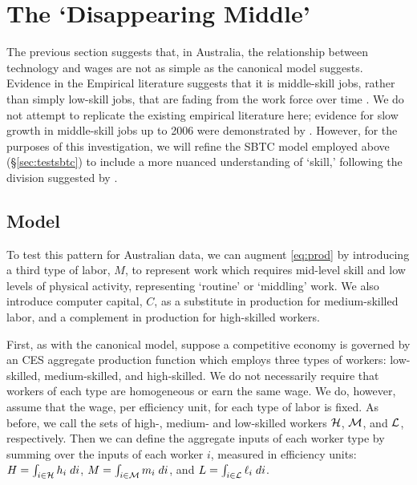 \section{The `Disappearing Middle'}\label{sec:disappearing}

The previous section suggests that, in Australia, the relationship between technology and wages are not as simple as the canonical model suggests. Evidence in the Empirical literature suggests that it is middle-skill jobs, rather than simply low-skill jobs, that are fading from the work force over time \citep[][e.g.]{Harding1997,Cully1999,Esposto2012}. We do not attempt to replicate the existing empirical literature here; evidence for slow growth in middle-skill jobs up to 2006 were demonstrated by \citep{Esposto2012}. However, for the purposes of this investigation, we will refine the SBTC model employed above (\S\ref{sec:testsbtc}) to include a more nuanced understanding of `skill,' following the division suggested by \citet{Levy2003}.

\subsection{Model}

To test this pattern for Australian data, we can augment \eqref{eq:prod} by introducing a third type of labor, $M$, to represent work which requires mid-level skill and low levels of physical activity, representing `routine' or `middling' work. We also introduce computer capital, $C$, as a substitute in production for medium-skilled labor, and a complement in production for high-skilled workers.

First, as with the canonical model, suppose a competitive economy is governed by an CES aggregate production function which employs three types of workers: low-skilled, medium-skilled, and high-skilled. We do not necessarily require that workers of each type are homogeneous or earn the same wage. We do, however, assume that the wage, per efficiency unit, for each type of labor is fixed. As before, we call the sets of high-, medium- and low-skilled workers $\mathcal{H}$, $\mathcal{M}$, and $\mathcal{L}$, respectively. Then we can define the aggregate inputs of each worker type by summing over the inputs of each worker $i$, measured in efficiency units: ${H = \int_{i\in\mathcal{H}}h_i\;di}$, ${M = \int_{i\in\mathcal{M}}m_i\;di}$, and ${L = \int_{i\in\mathcal{L}}\ell_i\;di}$.

